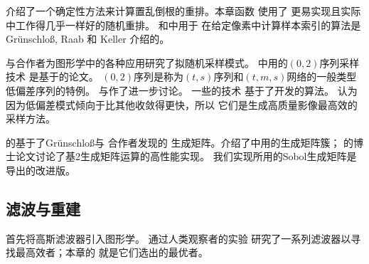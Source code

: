 \citet{FAURE199247}介绍了一个确定性方法来计算置乱倒根的重排。本章函数
使用了
更易实现且实际中工作得几乎一样好的随机重排。
和中用于
在给定像素中计算样本索引的算法是Gr\"{u}nschlo\ss{}, Raab 和 Keller
\parencite*{10.1007/978-3-642-27440-4_21}介绍的。

\citet{10.1007/978-3-7091-7484-5_11,10.1145/258734.258769,Keller03strictlydeterministic}
与合作者为图形学中的各种应用研究了拟随机采样模式。
中用的$(0,2)$序列采样技术
是基于\citet{10.1111/1467-8659.00706}的论文。
$(0,2)$序列是称为$(t,s)$序列和$(t,m,s)$网络的一般类型低偏差序列的特例。
\citet{10.1137/1.9781611970081}与\citet{dick_pillichshammer_2010}作了进一步讨论。
一些\citet{10.1111/1467-8659.00706}的技术
基于了\citet{10.1007/978-3-642-56046-0_17}开发的算法。
\citet{Keller03strictlydeterministic}
认为因为低偏差模式倾向于比其他收敛得更快，所以
它们是生成高质量影像最高效的采样方法。

的基于了Gr\"{u}nschlo\ss{}与
合作者\parencite*{10.1007/978-3-642-04107-5_25,10.1007/978-3-540-74496-2_23}发现的
生成矩阵。\citet{SOBOL196786}介绍了中用的生成矩阵簇；
\citet{Wächter_2008}的博士论文讨论了基2生成矩阵运算的高性能实现。
我们实现所用的Sobol生成矩阵是\citet{10.1137/070709359}导出的改进版。

\subsection{滤波与重建}\label{sub:滤波与重建}
\citet{10.1145/7529.8927}首先将高斯滤波器引入图形学。
\citet{10.1145/54852.378514}通过人类观察者的实验
研究了一系列滤波器以寻找最高效者；本章的
就是它们选出的最优者。\citet{10.1145/800224.806784}
